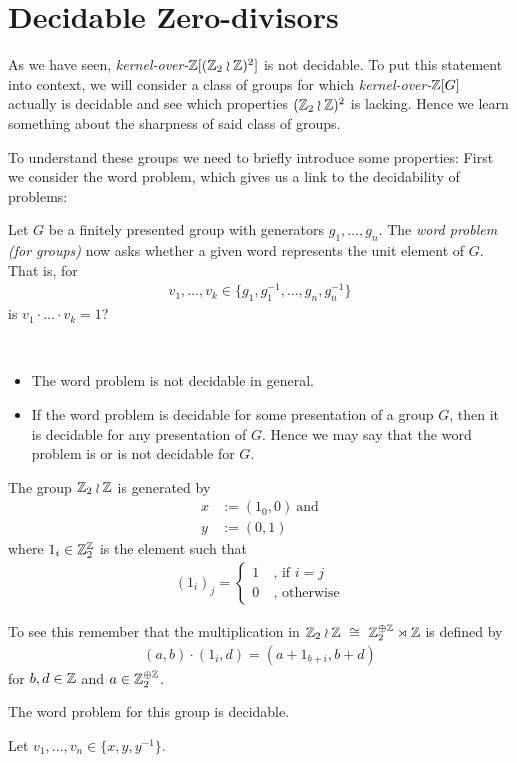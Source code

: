 \section{Decidable Zero-divisors}
\label{decidable_zero_divisors}

As we have seen, \emph{kernel-over-$\mathbb{Z}[(\mathbb{Z}_2 \wr \mathbb{Z})^2]$} is not decidable.
To put this statement into context, we will consider a class of groups for which \emph{kernel-over-$\mathbb{Z}[G]$} actually is decidable and see which properties $(\mathbb{Z}_2 \wr \mathbb{Z})^2$ is lacking.
Hence we learn something about the sharpness of said class of groups.

To understand these groups we need to briefly introduce some properties: First we consider the word problem, which gives us a link to the decidability of problems:

\begin{Definition}
	Let $G$ be a finitely presented group with generators $g_1,...,g_n$.
	The \emph{word problem (for groups)} now asks whether a given word represents the unit element of $G$. That is, for
	\begin{align*}
		v_1,...,v_k \in \{g_1,g_1^{-1},...,g_n,g_n^{-1}\}
	\end{align*}
	is $v_1 \cdot ... \cdot v_k = 1$?
\end{Definition}

\begin{Remark}
	\
	\begin{itemize}
		\item The word problem is not decidable in general. %
		\item If the word problem is decidable for some presentation of a group $G$, then it is decidable for any presentation of $G$.
			Hence we may say that the word problem is or is not decidable for $G$.
	\end{itemize}
\end{Remark}

\begin{Example}
	The group $\mathbb{Z}_2 \wr \mathbb{Z}$ is generated by
	\begin{align*}
		x &:= (1_0,0) ~\text{and} \\
		y &:= (0,1)
	\end{align*}
	where $1_i \in \mathbb{Z}_2^{\mathbb{Z}}$ is the element such that
	\begin{align*}
		 (1_i)_j = \begin{cases} 1~ &\text{, if $i = j$} \\ 0~ &\text{, otherwise} \end{cases}
	\end{align*}

	To see this remember that the multiplication in $\mathbb{Z}_2 \wr \mathbb{Z} ~\cong~ \mathbb{Z}_2^{\oplus \mathbb{Z}} \rtimes \mathbb{Z}$ is defined by
	\begin{align*}
		(a,b) \cdot (1_i,d) = (a + 1_{b+i}, b+d)
	\end{align*}
	for $b,d \in \mathbb{Z}$ and $a \in \mathbb{Z}_2^{\oplus \mathbb{Z}}$.

	The word problem for this group is decidable.
\end{Example}
\proof
	Let $v_1,...,v_n \in \{x,y,y^{-1}\}$.

